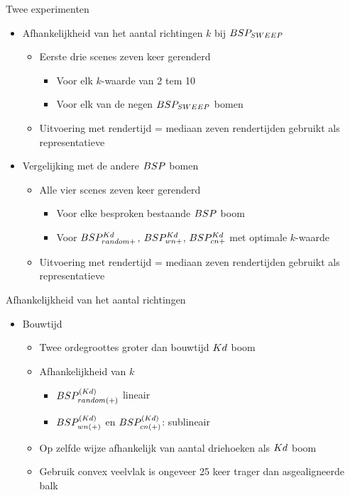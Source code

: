 \documentclass[11pt,t]{beamer}
\begin{document}
\begin{frame}{Twee experimenten}
	\begin{itemize}
		\item Afhankelijkheid van het aantal richtingen $k$ bij $BSP_{SWEEP}$
		\begin{itemize}
			\item Eerste drie scenes zeven keer gerenderd
				\begin{itemize}
					\item Voor elk $k$-waarde van 2 tem 10
					\item Voor elk van de negen $BSP_{SWEEP}$ bomen
				\end{itemize}
			\item Uitvoering met rendertijd = mediaan zeven rendertijden gebruikt als representatieve
		\end{itemize}
		\vspace{5pt}
		\item Vergelijking met de andere $BSP$ bomen
		\begin{itemize}
			\item Alle vier scenes zeven keer gerenderd
				\begin{itemize}
					\item Voor elke besproken bestaande $BSP$ boom
					\item Voor $BSP^{Kd}_{random+}$, $BSP^{Kd}_{wn+}$, $BSP^{Kd}_{cn+}$ met optimale $k$-waarde
				\end{itemize}
			\item Uitvoering met rendertijd = mediaan zeven rendertijden gebruikt als representatieve
		\end{itemize}
	\end{itemize}
\end{frame}

\begin{frame}{Afhankelijkheid van het aantal richtingen}
	\begin{itemize}
		\item Bouwtijd
		\begin{itemize}
			\item Twee ordegroottes groter dan bouwtijd $Kd$ boom
			\item Afhankelijkheid van $k$
				\begin{itemize}
					\item $BSP^{(Kd)}_{random(+)}$ lineair
					\item $BSP^{(Kd)}_{wn(+)}$ en $BSP^{(Kd)}_{cn(+)}$: sublineair
				\end{itemize}
			\item Op zelfde wijze afhankelijk van aantal driehoeken als $Kd$ boom
			\item Gebruik convex veelvlak is ongeveer 25 keer trager dan asgealigneerde balk
		\end{itemize}
	\end{itemize}
\end{frame}
\end{document}
